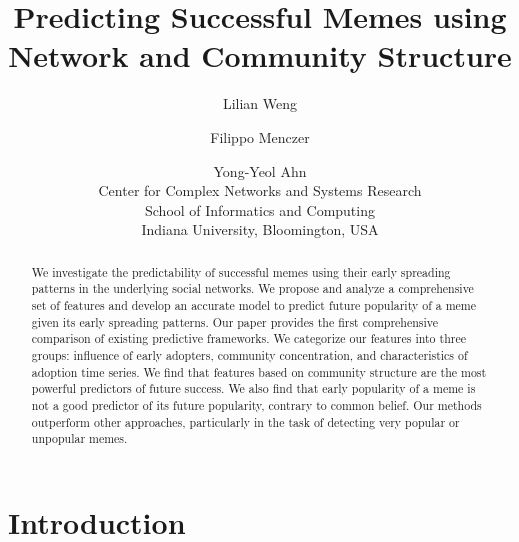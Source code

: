 \documentclass[letterpaper]{article}
\begin{document}
\title{Predicting Successful Memes using Network and Community Structure}

\author{
Lilian Weng \and Filippo Menczer \and Yong-Yeol Ahn\\
Center for Complex Networks and Systems Research\\
School of Informatics and Computing\\
Indiana University, Bloomington, USA\\
}

\maketitle

\begin{abstract}

We investigate the predictability of successful memes using their early spreading patterns in the underlying social networks. We propose and analyze a comprehensive set of features and develop an accurate model to predict future popularity of a meme given its early spreading patterns. Our paper provides the first comprehensive comparison of existing predictive frameworks. We categorize our features into three groups: influence of early adopters, community concentration, and characteristics of adoption time series. We find that features based on community structure are the most powerful predictors of future success. We also find that early popularity of a meme is not a good predictor of its future popularity, contrary to common belief. Our methods outperform other approaches, particularly in the task of detecting very popular or unpopular memes. 

\end{abstract}



\section{Introduction}
\end{document}
